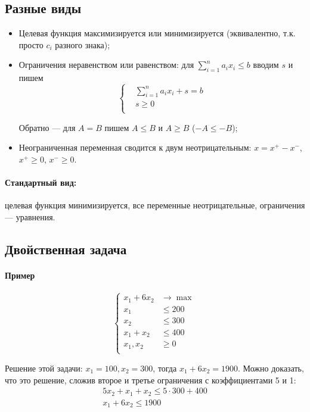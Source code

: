 \subsection{Разные виды}
\begin{itemize}
    \item Целевая функция максимизируется или минимизируется
    (эквивалентно, т.к. просто $c_i$ разного знака);

    \item Ограничения неравенством или равенством:
    для $\sum_{i=1}^n a_i x_i \le b$
    вводим $s$ и пишем
    \[
        \left\{
        \begin{aligned}
            & \sum_{i=1}^n a_i x_i + s = b \\
            & s \ge 0 \\
        \end{aligned}
        \right.
    \]

    Обратно --- для $A = B$ пишем $A \le B$ и $A \ge B$ ($-A \le -B$);

    \item Неограниченная переменная сводится к двум неотрицательным:
    $x = x^+ - x^-$, $x^+ \ge 0$, $x^- \ge 0$.
\end{itemize}

\paragraph{Стандартный вид:}
целевая функция минимизируется,
все переменные неотрицательные,
ограничения --- уравнения.

\subsection{Двойственная задача}
\paragraph{Пример}
\[
    \left\{
    \begin{aligned}
        x_1 + 6 x_2 & \to \max \\
        x_1 & \le 200 \\
        x_2 & \le 300 \\
        x_1 + x_2 & \le 400 \\
        x_1, x_2 & \ge 0 \\
    \end{aligned}
    \right.
\]

Решение этой задачи:
$x_1 = 100, x_2 = 300$,
тогда $x_1 + 6 x_2 = 1900$.
Можно доказать, что это решение, сложив
второе и третье ограничения с коэффициентами 5 и 1:
\begin{gather*}
    5 x_2 + x_1 + x_2 \le 5 \cdot 300 + 400 \\
    x_1 + 6 x_2 \le 1900
\end{gather*}

